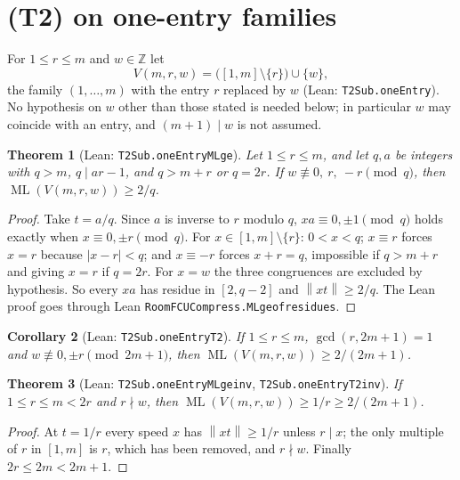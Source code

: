 \documentclass[11pt]{amsart}
\theoremstyle{plain}
\newtheorem{theorem}{Theorem}[section]
\newtheorem{corollary}[theorem]{Corollary}
\theoremstyle{definition}
\theoremstyle{remark}
\newcommand{\nrm}[1]{\left\lVert #1 \right\rVert}
\newcommand{\ML}{\operatorname{ML}}
\newcommand{\Z}{\mathbb{Z}}
\newcommand{\lean}[1]{{\def\_{\textunderscore\allowbreak}\def\.{.\allowbreak}\texttt{#1}}}
\begin{document}
\section{(T2) on one-entry families}\label{sec:oneentry}

For $1\le r\le m$ and $w\in\Z$ let
\[
  V(m,r,w)=\big([1,m]\setminus\{r\}\big)\cup\{w\},
\]
the family $(1,\dots,m)$ with the entry $r$ replaced by $w$ (Lean: \lean{T2Sub\.oneEntry}). No
hypothesis on $w$ other than those stated is needed below; in particular $w$ may coincide with
an entry, and $(m+1)\mid w$ is not assumed.

\begin{theorem}[Lean: \lean{T2Sub\.oneEntry\_ML\_ge}]\label{thm:oneA}
Let $1\le r\le m$, and let $q,a$ be integers with $q>m$, $q\mid ar-1$, and $q>m+r$ or $q=2r$. If
$w\not\equiv 0,\ r,\ -r\pmod q$, then $\ML(V(m,r,w))\ge 2/q$.
\end{theorem}

\begin{proof}
Take $t=a/q$. Since $a$ is inverse to $r$ modulo $q$, $xa\equiv 0,\pm1\pmod q$ holds exactly when
$x\equiv 0,\pm r\pmod q$. For $x\in[1,m]\setminus\{r\}$: $0<x<q$; $x\equiv r$ forces $x=r$
because $|x-r|<q$; and $x\equiv -r$ forces $x+r=q$, impossible if $q>m+r$ and giving $x=r$ if
$q=2r$. For $x=w$ the three congruences are excluded by hypothesis. So every $xa$ has residue in
$[2,q-2]$ and $\nrm{xt}\ge 2/q$. The Lean proof goes through Lean
\lean{RoomFCUCompress\.ML\_ge\_of\_residues}.
\end{proof}

\begin{corollary}[Lean: \lean{T2Sub\.oneEntry\_T2}]\label{cor:oneA}
If $1\le r\le m$, $\gcd(r,2m+1)=1$ and $w\not\equiv 0,\pm r\pmod{2m+1}$, then
$\ML(V(m,r,w))\ge 2/(2m+1)$.
\end{corollary}

\begin{theorem}[Lean: \lean{T2Sub\.oneEntry\_ML\_ge\_inv}, \lean{T2Sub\.oneEntry\_T2\_inv}]\label{thm:oneB}
If $1\le r\le m<2r$ and $r\nmid w$, then $\ML(V(m,r,w))\ge 1/r\ge 2/(2m+1)$.
\end{theorem}

\begin{proof}
At $t=1/r$ every speed $x$ has $\nrm{xt}\ge1/r$ unless $r\mid x$; the only multiple of $r$ in
$[1,m]$ is $r$, which has been removed, and $r\nmid w$. Finally $2r\le 2m<2m+1$.
\end{proof}
\end{document}
